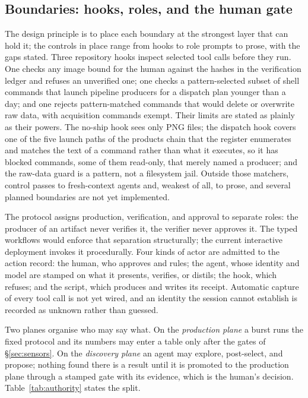 \subsection{Boundaries: hooks, roles, and the human gate} \label{sec:boundaries}\label{sec:authority}\label{sec:planes}

The design principle is to place each boundary at the strongest layer that
can hold it; the controls in place range from hooks to role prompts to
prose, with the gaps stated. Three repository hooks\prov{} inspect selected
tool calls before they run. One checks any image bound for the human
against the hashes in the verification ledger and refuses an unverified
one; one checks a pattern-selected subset of shell commands that launch
pipeline producers for a dispatch plan younger than a day; and one rejects
pattern-matched commands that would delete or overwrite raw data, with
acquisition commands exempt. Their limits are stated as plainly as their
powers. The no-ship hook sees only PNG files; the dispatch hook covers
one of the five launch paths of the products chain that the register
enumerates\prov{} and matches the text of a
command rather than what it executes, so it has blocked commands, some of
them read-only, that merely named a producer; and the raw-data guard is a
pattern, not a
filesystem jail. Outside those matchers, control passes to fresh-context
agents and, weakest of all, to prose, and several planned boundaries are
not yet implemented.

The protocol assigns production, verification, and approval to separate
roles: the producer of an artifact never verifies it, the verifier never
approves it. The typed workflows would enforce that separation
structurally; the current interactive deployment invokes it procedurally.
Four kinds of actor are admitted to the action record: the human, who
approves and rules; the agent, whose identity and model are stamped on what
it presents, verifies, or distils; the hook, which refuses; and the script,
which produces and writes its receipt. Automatic capture of every tool call
is not yet wired, and an identity the session cannot establish is recorded
as unknown rather than guessed.

Two planes organise who may say what. On the \emph{production plane} a
burst runs the fixed protocol and its numbers may enter a table only after
the gates of \S\ref{sec:sensors}. On the \emph{discovery plane} an agent
may explore, post-select, and propose; nothing found there is a result
until it is promoted to the production plane through a stamped gate with
its evidence, which is the human's decision. Table~\ref{tab:authority}
states the split.


